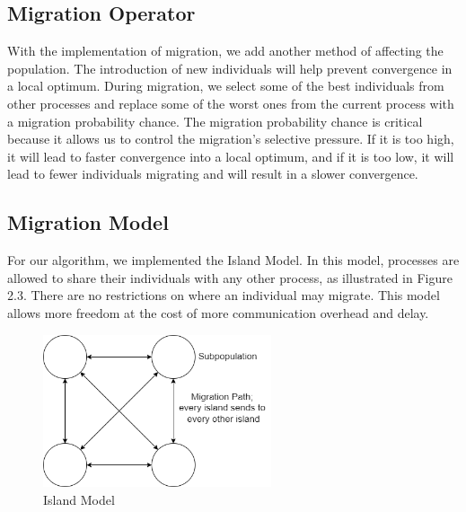 \subsection{Migration Operator}
With the implementation of migration, we add another method of affecting the population. The introduction of new individuals will help prevent convergence in a local optimum. During migration, we select some of the best individuals from other processes and replace some of the worst ones from the current process with a migration probability chance. The migration probability chance is critical because it allows us to control the migration's selective pressure. If it is too high, it will lead to faster convergence into a local optimum, and if it is too low, it will lead to fewer individuals migrating and will result in a slower convergence.
\newpage
\subsection{Migration Model}
For our algorithm, we implemented the Island Model. In this model, processes are allowed to share their individuals with any other process, as illustrated in Figure 2.3. There are no restrictions on where an individual may migrate. This model allows more freedom at the cost of more communication overhead and delay.
\begin{figure}[ht]
\includegraphics[width=0.6\textwidth]{images/island_model.png}
\caption{Island Model}
\end{figure}
